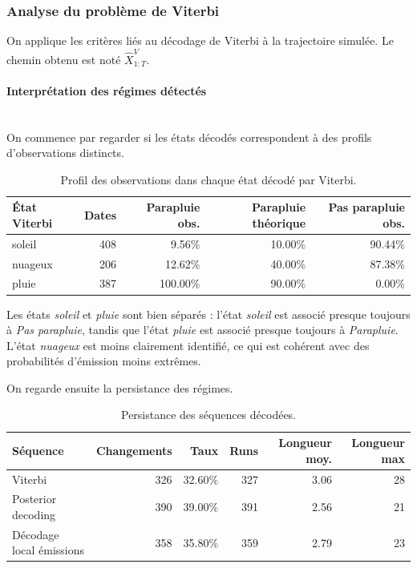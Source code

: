 \documentclass[11pt]{article}
\begin{document}
\subsubsection{Analyse du problème de Viterbi}

On applique les critères liés au décodage de Viterbi à la trajectoire simulée. Le chemin obtenu est
noté \(\hat X^V_{1:T}\).

\paragraph{Interprétation des régimes détectés}\mbox{}\\

On commence par regarder si les états décodés correspondent à des profils d'observations distincts.

\begin{table}[H]
\centering
\begin{tabular}{lrrrr}
\toprule
État Viterbi & Dates & Parapluie obs. & Parapluie théorique & Pas parapluie obs. \\
\midrule
soleil & 408 & 9.56\% & 10.00\% & 90.44\% \\
nuageux & 206 & 12.62\% & 40.00\% & 87.38\% \\
pluie & 387 & 100.00\% & 90.00\% & 0.00\% \\
\bottomrule
\end{tabular}
\caption{Profil des observations dans chaque état décodé par Viterbi.}
\end{table}

Les états \emph{soleil} et \emph{pluie} sont bien séparés : l'état \emph{soleil} est associé presque
toujours à \emph{Pas parapluie}, tandis que l'état \emph{pluie} est associé presque toujours à
\emph{Parapluie}. L'état \emph{nuageux} est moins clairement identifié, ce qui est cohérent avec
des probabilités d'émission moins extrêmes.

On regarde ensuite la persistance des régimes.

\begin{table}[H]
\centering
\begin{tabular}{lrrrrr}
\toprule
Séquence & Changements & Taux & Runs & Longueur moy. & Longueur max \\
\midrule
Viterbi & 326 & 32.60\% & 327 & 3.06 & 28 \\
Posterior decoding & 390 & 39.00\% & 391 & 2.56 & 21 \\
Décodage local émissions & 358 & 35.80\% & 359 & 2.79 & 23 \\
\bottomrule
\end{tabular}
\caption{Persistance des séquences décodées.}
\end{table}
\end{document}

